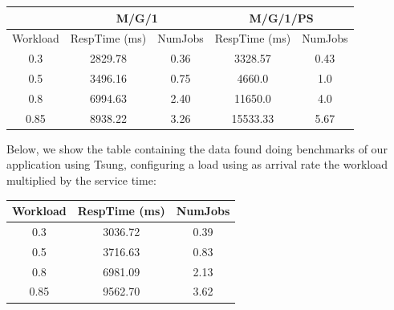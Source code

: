 \documentclass[11pt]{scrartcl} %
\begin{document}
\begin{table}[H]
\centering
\begin{tabular}{c|c|c|cc}
\multicolumn{1}{l|}{}         & \multicolumn{2}{c|}{M/G/1}                                                        & \multicolumn{2}{c}{M/G/1/PS}                                                     \\ \hline
\multicolumn{1}{l|}{Workload} & \multicolumn{1}{l|}{RespTime (ms)} & \multicolumn{1}{l|}{NumJobs} & \multicolumn{1}{l|}{RespTime (ms)} & \multicolumn{1}{l}{NumJobs} \\ \hline
0.3                           & 2829.78                            & 0.36                                         & \multicolumn{1}{c|}{3328.57}       & 0.43                                        \\
0.5                           & 3496.16                            & 0.75                                         & \multicolumn{1}{c|}{4660.0}        & 1.0                                         \\
0.8                           & 6994.63                            & 2.40                                         & \multicolumn{1}{c|}{11650.0}       & 4.0                                         \\
0.85                          & 8938.22                            & 3.26                                         & \multicolumn{1}{c|}{15533.33}      & 5.67                                       
\end{tabular}
\end{table}

Below, we show the table containing the data found doing benchmarks of our application using Tsung, configuring a load using as arrival rate the workload multiplied by the service time:

\begin{table}[H]
\centering
\begin{tabular}{c|c|c}
\multicolumn{1}{l|}{Workload} & \multicolumn{1}{l|}{RespTime (ms)} & \multicolumn{1}{l}{NumJobs} \\ \hline
0.3                           & 3036.72                            & 0.39                         \\
0.5                           & 3716.63                            & 0.83                         \\
0.8                           & 6981.09                            & 2.13                         \\
0.85                          & 9562.70                            & 3.62                        
\end{tabular}
\end{table}
\end{document}
